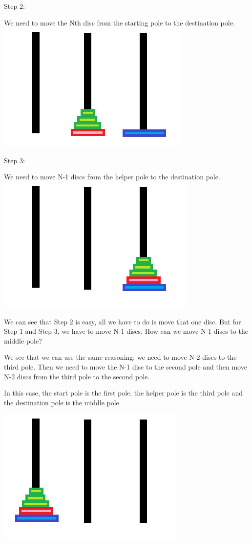 \documentclass[11pt,oneside]{book}
\makeatletter
\def\maxwidth#1{\ifdim\Gin@nat@width>#1 #1\else\Gin@nat@width\fi}
\makeatother
\begin{document}
Step 2:

We need to move the Nth disc from the starting pole to the destination pole.
\includegraphics[width=\maxwidth{\textwidth}]{hanoi3.png}

Step 3:

We need to move N-1 discs from the helper pole to the destination pole.
\includegraphics[width=\maxwidth{\textwidth}]{hanoi4.png}

We can see that Step 2 is easy, all we have to do is move that one disc. But for Step 1 and Step 3, we have to move N-1 discs. How can we move N-1 discs to the middle pole?

We see that we can use the same reasoning: we need to move N-2 discs to the third pole. Then we need to move the N-1 disc to the second pole and then move N-2 discs from the third pole to the second pole.

In this case, the start pole is the first pole, the helper pole is the third pole and the destination pole is the middle pole.

\includegraphics[width=\maxwidth{\textwidth}]{hanoi.png}
\end{document}

